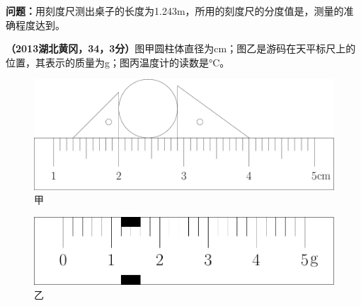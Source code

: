 \documentclass[12pt]{exam}%
\begin{document}
\begin{knowledge}
\textbf{问题：}用刻度尺测出桌子的长度为1.243m，所用的刻度尺的分度值是\answerline*[cm]，测量的准确程度达到\answerline*[1cm]。

\textbf{（2013湖北黄冈，34，3分）}图甲圆柱体直径为\answerline*[0.90]cm；图乙是游码在天平标尺上的位置，其表示的质量为\answerline*[1.2]g；图丙温度计的读数是\answerline*[9]\si{\degreeCelsius}。

\newpage
\noindent
\begin{minipage}{\textwidth}
\begin{minipage}{0.78\textwidth}
\begin{figure}[H]
\includegraphics[width=\linewidth]{figures/2013湖北黄冈34甲.pdf} 
\caption{甲}
\end{figure}
\begin{figure}[H]
\includegraphics[width=\linewidth]{figures/2013湖北黄冈34乙.pdf} 
\caption{乙}
\end{figure}
\end{minipage}\hfill
\begin{minipage}{0.2\textwidth}
\begin{figure}[H]
\centering

\end{figure}
\end{minipage}
\end{minipage}
\end{knowledge}
\end{document}
